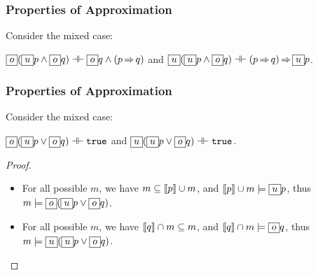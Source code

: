 \begin{frame}[fragile]
    \frametitle{Properties of Approximation}

Consider the mixed case:

\begin{lemma} $\boxed{o}(\boxed{u} p \land \boxed{o} q) \dashv\vdash \boxed{o} q \land (p {\,\Rightarrow\,} q)$ and $\boxed{u}(\boxed{u} p \land \boxed{o} q) \dashv\vdash (p {\,\Rightarrow\,} q) {\,\Rightarrow\,} \boxed{u} p$.
\end{lemma}

\end{frame}

\begin{frame}[fragile]
    \frametitle{Properties of Approximation}

Consider the mixed case:

\begin{lemma} $\boxed{o}(\boxed{u} p \lor \boxed{o} q) \dashv\vdash {\tt true}$ and $\boxed{u}(\boxed{u} p \lor \boxed{o} q) \dashv\vdash {\tt true}$.
\end{lemma}
\begin{proof}
    \begin{itemize}
        \item For all possible $m$, we have $m \subseteq \llbracket {p} \rrbracket \cup m$, and $\llbracket {p} \rrbracket \cup m \models \boxed{u} p$, thus $m \models \boxed{o}(\boxed{u} p \lor \boxed{o} q)$.
        \item For all possible $m$, we have $\llbracket {q} \rrbracket \cap m \subseteq m$, and $\llbracket {q} \rrbracket \cap m \models \boxed{o} q$, thus $m \models \boxed{u}(\boxed{u} p \lor \boxed{o} q)$.
    \end{itemize}
\end{proof}

\end{frame}

